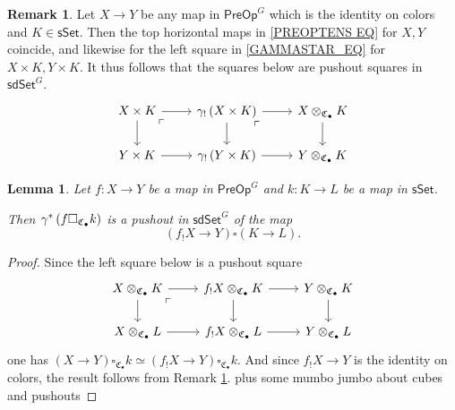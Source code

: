 \documentclass[a4paper,10pt
,draft
]{article}%
\numberwithin{equation}{section}
\numberwithin{figure}{section}
\newtheorem{lemma}[equation]{Lemma}%
\theoremstyle{definition} %
\newtheorem{remark}[equation]{Remark}%
\newcommand{\1}{\ensuremath{\mathbbm 1}}%
\begin{document}
\begin{remark}\label{COLORTENSGAM REM}
	Let $X \to Y$ be any map in $\mathsf{PreOp}^G$
	which is the identity on colors and 
	$K \in \mathsf{sSet}$. 
	Then the top horizontal maps in \eqref{PREOPTENS EQ}
	for $X,Y$ coincide, 
	and likewise for the 
	left square in \eqref{GAMMASTAR_EQ} for
	$X \times K, Y \times K$.
%
	It thus follows that the squares below are pushout squares in $\mathsf{sdSet}^G$.
\[
\begin{tikzcd}
	X \times K \ar{r} \ar{d} 
	\arrow[dr, phantom, "\ulcorner", very near start] 
&
	\gamma_! \left( X \times K \right) \ar{r} \ar{d} 
	\arrow[dr, phantom, "\ulcorner", very near start] 
&
	X \otimes_{\mathfrak{C}_{\bullet}} K \ar{d}
\\
	Y \times K \ar{r} 
&
	\gamma_! \left( Y \times K \right) \ar{r} 
&
	Y \otimes_{\mathfrak{C}_{\bullet}} K
\end{tikzcd}
\]
\end{remark}



\begin{lemma}\label{OTIMSETPUSH LEM}
	Let $f\colon X \to Y$ be a map in $\mathsf{PreOp}^G$
	and $k \colon K \to L$ be a map in $\mathsf{sSet}$.

	Then $\gamma^{\**}\left(f \square_{\mathfrak{C}_{\bullet}} k\right)$
	is a pushout in $\mathsf{sdSet}^G$
	of the map
\[
	\left(f_! X \to Y\right)
	\square
	\left( K \to L \right).
\]
\end{lemma}


\begin{proof}
Since the left square below is a pushout square
\[
\begin{tikzcd}
	X \otimes_{\mathfrak{C}_{\bullet}} K \ar{r} \ar{d} 
	\arrow[dr, phantom, "\ulcorner", very near start]
&
	f_! X \otimes_{\mathfrak{C}_{\bullet}} K \ar{r} \ar{d} 
&
	Y \otimes_{\mathfrak{C}_{\bullet}} K \ar{d}
\\
	X \otimes_{\mathfrak{C}_{\bullet}} L \ar{r} 
&
	f_! X \otimes_{\mathfrak{C}_{\bullet}} L \ar{r} 
&
	Y \otimes_{\mathfrak{C}_{\bullet}} L
\end{tikzcd}
\]
one has
$(X \to Y) \square_{\mathfrak{C}_{\bullet}} k 
\simeq 
(f_!X \to Y) \square_{\mathfrak{C}_{\bullet}} k$.
And since $f_!X \to Y$ is the identity on colors,
the result follows from Remark \ref{COLORTENSGAM REM}.
	{\color{blue} plus some mumbo jumbo about cubes and pushouts}
\end{proof}
\end{document}
